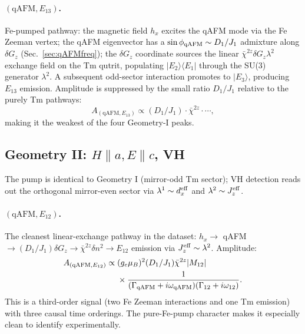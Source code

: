 \documentclass[reprint,amsmath,amssymb,aps,prb,longbibliography]{revtex4-2}
\begin{document}
\paragraph{$(\mathrm{qAFM}, E_{13})$.} Fe-pumped pathway: the magnetic
field $h_x$ excites the qAFM mode via the Fe Zeeman vertex; the qAFM
eigenvector has a $\sin\phi_{\rm qAFM}\sim D_1/J_1$ admixture along
$\delta G_z$ (Sec.~\ref{sec:qAFMfreq}); the $\delta G_z$ coordinate
sources the linear $\bar\chi^{2z}\delta G_z\lambda^2$ exchange field on
the Tm qutrit, populating $|E_2\rangle\langle E_1|$ through the SU(3)
generator $\lambda^2$. A subsequent odd-sector interaction promotes to
$|E_3\rangle$, producing $E_{13}$ emission. Amplitude is
suppressed by the small ratio $D_1/J_1$ relative to the purely Tm
pathways:
\begin{equation}
A_{(\mathrm{qAFM},E_{13})} \propto (D_1/J_1)\cdot\bar\chi^{2z}\cdot\cdots,
\label{eq:A_qAFME13}
\end{equation}
making it the weakest of the four Geometry-I peaks.

\subsection{Geometry II: \texorpdfstring{$H\parallel a, E\parallel c$, VH}{H||a, E||c, VH}}

The pump is identical to Geometry I (mirror-odd Tm sector); VH
detection reads out the orthogonal mirror-even sector via
$\lambda^1\sim d_x^{\rm eff}$ and $\lambda^2\sim J_z^{\rm eff}$.

\paragraph{$(\mathrm{qAFM}, E_{12})$.} The cleanest linear-exchange
pathway in the dataset: $h_x\to$ qAFM $\to (D_1/J_1)\delta G_z \to
\bar\chi^{2z}\delta n^2 \to E_{12}$ emission via $J_z^{\rm eff}\sim
\lambda^2$. Amplitude:
\begin{equation}
\begin{aligned}
A_{(\mathrm{qAFM}, E_{12})} \propto\;& (g_e\mu_B)^2 (D_1/J_1)\bar\chi^{2z} |M_{12}|\\
&\times\frac{1}{(\Gamma_{\rm qAFM}+i\omega_{\rm qAFM})(\Gamma_{12}+i\omega_{12})}.
\end{aligned}
\label{eq:A_qAFME12}
\end{equation}
This is a third-order signal (two Fe Zeeman interactions and one Tm
emission) with three causal time orderings. The pure-Fe-pump character
makes it especially clean to identify experimentally.
\end{document}
